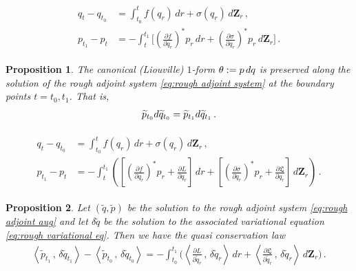 \documentclass[10pt,a4paper]{amsart}
\newtheorem{proposition}{Proposition}
\def\p{{\partial}}
\def\rmd{{\rm d}}
\newcommand{\scp}[2]{{\left\langle {#1}\, , \, {#2}\right\rangle}}
\newcommand{\wt}[1]{\widetilde{#1}}
\begin{document}
\begin{align} \label{eq:rough adjoint system}
\begin{split}
q_t - q_{t_0} &= \int_{t_0}^t f(q_r)\,dr + \sigma(q_r)\, d\mathbf{Z}_r \,, \\
p_{t_1} - p_t &= -\int_t^{t_1} \bigg[\left(\frac{\p f}{\p q_r}\right)^*p_r\,dr + \left(\frac{\p \sigma}{\p q_r}\right)^* p_r\, d\mathbf{Z}_r\bigg]\,.
\end{split}
\end{align}

\begin{proposition}\label{prop:canonical one form conservation}
    The canonical (Liouville) $1$-form $\theta := p\,\rmd q$ is preserved along the solution of the rough adjoint system \eqref{eq:rough adjoint system} at the boundary points $t = t_0, t_1$. That is,
    \begin{align}
        \wt{p}_{t_0}\rmd \wt{q}_{t_0} = \wt{p}_{t_1}\rmd \wt{q}_{t_1}\,.
    \end{align}
\end{proposition}

\begin{align}\label{eq:rough adjoint aug}
    \begin{split}
        q_t - q_{t_0} &= \int_{t_0}^t f(q_r)\,dr + \sigma(q_r)\, d\mathbf{Z}_r \,, \\
        p_{t_1} - p_t &= - \int_t^{t_1} \left(\left[\left(\frac{\p f}{\p q_r}\right)^*p_r + \frac{\p L}{\p q_r}\right]\,dr + \left[\left(\frac{\p \sigma}{\p q_r}\right)^* p_r + \frac{\p \mathfrak{L}}{\p q_r}\right]\, d\mathbf{Z}_r\right)\,.
    \end{split}
\end{align}

\begin{proposition}\label{prop:aug 1form conservation}
    Let $(\wt{q}, \wt{p})$ be the solution to the rough adjoint system \eqref{eq:rough adjoint aug} and let $\delta\wt{q}$ be the solution to the associated variational equation \eqref{eq:rough variational eq}. Then we have the quasi conservation law
    \begin{align}
        \scp{\wt{p}_{t_1}}{\delta \wt{q}_{t_1}} - \scp{\wt{p}_{t_0}}{\delta \wt{q}_{t_0}} = -\int_{t_0}^{t_1} \Bigg(\scp{\frac{\p L}{\p \wt{q}_r}}{\delta \wt{q}_r}\,dr + \scp{\frac{\p \mathfrak{L}}{\p \wt{q}_r}}{\delta \wt{q}_r}\,d\mathbf{Z}_r\Bigg)\,.\label{eq:quasi 1-form conservation}
    \end{align}
\end{proposition}
\end{document}
